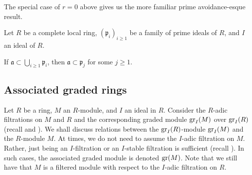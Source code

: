 The special case of $r = 0$ above gives us the more familiar prime avoidance-esque result.

\begin{cor}
	Let $R$ be a complete local ring, $(\mathfrak{p}_{i})_{i \ge 1}$ be a family of prime ideals of $R$, and $I$ an ideal of $R$.

	If $\mathfrak{a} \subset \bigcup_{i \ge 1} \mathfrak{p}_{i}$, then $\mathfrak{a} \subset \mathfrak{p}_{j}$ for some $j \ge 1$.
\end{cor}

\subsection{Associated graded rings}

Let $R$ be a ring, $M$ an $R$-module, and $I$ an ideal in $R$. Consider the $R$-adic filtrations on $M$ and $R$ and the corresponding graded module $\operatorname{gr}_{I}(M)$ over $\operatorname{gr}_{I}(R)$ (recall  and ). \newline
We shall discuss relations between the $\operatorname{gr}_{I}(R)$-module $\operatorname{gr}_{I}(M)$ and the $R$-module $M$. At times, we do not need to assume the $I$-adic filtration on $M$. Rather, just being an $I$-filtration or an $I$-stable filtration is sufficient (recall ). In such cases, the associated graded module is denoted $\operatorname{gr}(M)$. Note that we still have that $M$ is a filtered module with respect to the $I$-adic filtration on $R$.

